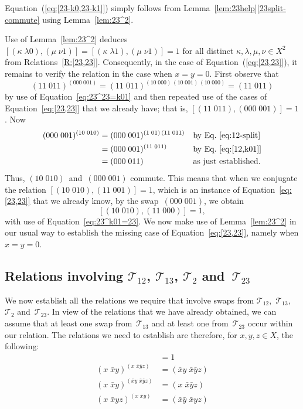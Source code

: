 \documentclass[a4paper,11pt]{article}
\numberwithin{equation}{section}
\newcommand{\eqstate}[1]{Equation~(\ref{#1})}
\newcommand{\swap}[2]{(#1\;#2)}
\newcommand{\Sw}[1]{\mathcal{T}_{#1}}
\begin{document}
\eqstate{eq:[23-k0,23-k1]} simply follows from
Lemma~\ref{lem:23help}\ref{23split-commute} using
Lemma~\ref{lem:23^2}.

Use of Lemma~\ref{lem:23^2} deduces $[ \swap{\kappa}{\lambda0} ,
  \swap{\mu}{\nu1} ] = [ \swap{\kappa}{\lambda1} , \swap{\mu}{\nu1} ]
= 1$ for all distinct $\kappa,\lambda,\mu,\nu \in X^{2}$ from
Relations~\ref{R:[23,23]}.  Consequently, in
the case of \eqstate{eq:[23,23]}, it remains to verify the relation in
the case when $x = y = 0$.  First observe that
\[
\swap{11}{011}^{\swap{000}{001}} =
\swap{11}{011}^{\swap{10}{000} \, \swap{10}{001} \, \swap{10}{000}}
= \swap{11}{011}
\]
by use of Equation~\eqref{eq:23^23=k01} and then repeated use of the
cases of Equation~\eqref{eq:[23,23]} that we already have; that is, $[
  \swap{11}{011} , \swap{000}{001} ] = 1$.  Now
\begin{align*}
  \swap{000}{001}^{\swap{10}{010}}
  &= \swap{000}{001}^{\swap{1}{01} \, \swap{11}{011}}
  &&\text{by Eq.~\eqref{eq:12-split}} \\
  &= \swap{000}{001}^{\swap{11}{011}}
  &&\text{by Eq.~\eqref{eq:[12,k01]}} \\
  &= \swap{000}{011}
  &&\text{as just established.}
\end{align*}
Thus, $\swap{10}{010}$~and~$\swap{000}{001}$ commute.  This means that
when we conjugate the relation $[ \swap{10}{010}, \swap{11}{001} ] =
1$, which is an instance of Equation~\eqref{eq:[23,23]} that we
already know, by the swap~$\swap{000}{001}$, we obtain
\[
[ \swap{10}{010} , \swap{11}{000} ] = 1,
\]
with use of Equation~\eqref{eq:23^k01=23}.  We now make use of
Lemma~\ref{lem:23^2} in our usual way to establish the missing case of
Equation~\eqref{eq:[23,23]}, namely when $x = y = 0$.

\subsection{\boldmath Relations involving $\Sw{12}$, $\Sw{13}$,
  $\Sw{2}$ and~$\Sw{23}$}

We now establish all the relations we require that involve swaps from
$\Sw{12}$,~$\Sw{13}$, $\Sw{2}$ and~$\Sw{23}$.  In view of the
relations that we have already obtained, we can assume that at least
one swap from~$\Sw{13}$ and at least one from~$\Sw{23}$ occur within
our relation.  The relations we need to establish are therefore, for
$x,y,z \in X$, the following:
\begin{align}
  [ \swap{x}{\bar{x}yz} , \swap{\bar{x}\bar{y}}{\bar{x}y\bar{z}} ] &=
  1
  \label{eq:[13,23]}
  \\
  \swap{x}{\bar{x}y}^{\swap{x}{\bar{x}\bar{y}z}} &=
  \swap{\bar{x}y}{\bar{x}\bar{y}z}
  \label{eq:12^13=23}
  \\
  \swap{x}{\bar{x}y}^{\swap{\bar{x}y}{\bar{x}\bar{y}z}} &=
  \swap{x}{\bar{x}\bar{y}z}
  \label{eq:12^23=13}
  \\
  \swap{x}{\bar{x}yz}^{\swap{x}{\bar{x}\bar{y}}} &=
  \swap{\bar{x}\bar{y}}{\bar{x}yz}
  \label{eq:13^12=23}
\end{align}
\end{document}
